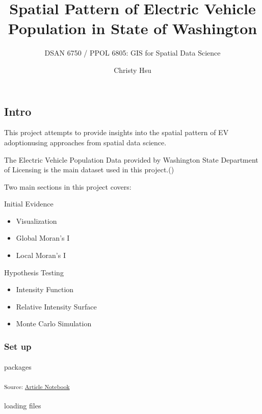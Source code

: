 \documentclass[
  letterpaper,
  DIV=11,
  numbers=noendperiod]{scrartcl}
\title{Spatial Pattern of Electric Vehicle Population in State of
Washington}
\subtitle{DSAN 6750 / PPOL 6805: GIS for Spatial Data Science}
\author{Christy Hsu}
\date{}
\makeatletter
\let\oldparagraph\paragraph
\renewcommand{\paragraph}{
    \@ifstar
      \xxxParagraphStar
      \xxxParagraphNoStar
  }
\newcommand{\xxxParagraphStar}[1]{\oldparagraph*{#1}\mbox{}}
\newcommand{\xxxParagraphNoStar}[1]{\oldparagraph{#1}\mbox{}}
\providecommand{\tightlist}{%
  \setlength{\itemsep}{0pt}\setlength{\parskip}{0pt}}\usepackage{longtable,booktabs,array}
\makeatother
\begin{document}
\maketitle


\subsection{Intro}\label{intro}

This project attempts to provide insights into the spatial pattern of EV
adoptionusing approaches from spatial data science.

The Electric Vehicle Population Data provided by Washington State
Department of Licensing is the main dataset used in this
project.()

Two main sections in this project covers:

Initial Evidence

\begin{itemize}
\tightlist
\item
  Visualization
\item
  Global Moran's I
\item
  Local Moran's I
\end{itemize}

Hypothesis Testing

\begin{itemize}
\tightlist
\item
  Intensity Function
\item
  Relative Intensity Surface
\item
  Monte Carlo Simulation
\end{itemize}

\subsubsection{Set up}\label{set-up}

\paragraph{packages}\label{packages}

\textsubscript{Source:
\href{https://h-christy.github.io/24-manuscript/index.qmd.html}{Article
Notebook}}

\paragraph{loading files}\label{loading-files}
\end{document}

